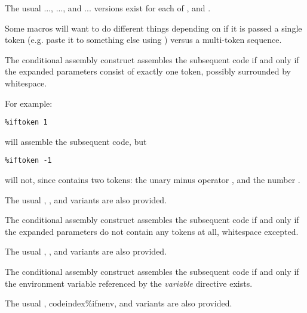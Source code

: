 The usual ...,
..., and
...
versions exist for each of ,  and .


Some macros will want to do different things depending on if it is
passed a single token (e.g. paste it to something else using \code{\%+})
versus a multi-token sequence.

The conditional assembly construct  assembles the
subsequent code if and only if the expanded parameters consist of
exactly one token, possibly surrounded by whitespace.

For example:

\begin{lstlisting}
%iftoken 1
\end{lstlisting}

will assemble the subsequent code, but

\begin{lstlisting}
%iftoken -1
\end{lstlisting}

will not, since  contains two tokens: the unary minus operator
\code{-}, and the number .

The usual , , and
 variants are also provided.


The conditional assembly construct  assembles the
subsequent code if and only if the expanded parameters do not contain
any tokens at all, whitespace excepted.

The usual , , and
 variants are also provided.


The conditional assembly construct  assembles the
subsequent code if and only if the environment variable referenced by
the \emph{variable} directive exists.

The usual , codeindex{\%ifnenv}, and 
variants are also provided.

